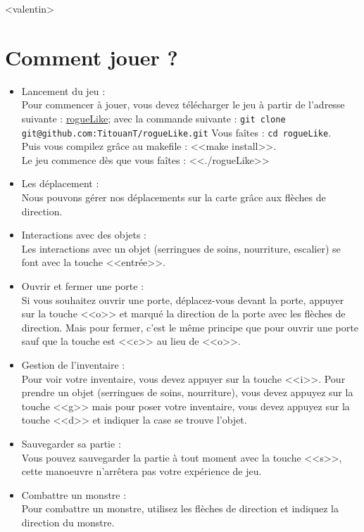 \documentclass[11pt]{report}
\begin{document}
	<valentin>
	
	\section{Comment jouer ?}
		\begin{itemize}
			\item{Lancement du jeu : \\}
				Pour commencer à jouer, vous devez télécharger le jeu à partir de l'adresse suivante : \href{https://github.com/TitouanT/rogueLike/} {rogueLike}; avec la commande suivante : \texttt{git clone git@github.com:TitouanT/rogueLike.git}
				Vous faîtes : \texttt{cd rogueLike}. \\
				Puis vous compilez grâce au makefile : <<make install>>. \\
				Le jeu commence dès que vous faîtes : <<./rogueLike>>		
			\item{Les déplacement : \\}
				Nous pouvons gérer nos déplacements sur la carte grâce aux flèches de direction. 
			\item{Interactions avec des objets : \\}	
				Les interactions avec un objet (serringues de soins, nourriture, escalier) se font avec la touche <<entrée>>.
			\item{Ouvrir et fermer une porte :\\}	
				Si vous souhaitez ouvrir une porte, déplacez-vous devant la porte, appuyer sur la touche <<o>> et marqué la direction de la porte avec les flèches de direction.
				Mais pour fermer, c'est le même principe que pour ouvrir une porte sauf que la touche est <<c>> au lieu de <<o>>.
			\item{Gestion de l'inventaire : \\}
				Pour voir votre inventaire, vous devez appuyer sur la touche <<i>>. Pour prendre un objet (serringues de soins, nourriture), vous devez appuyez sur la touche <<g>> mais pour poser votre inventaire, vous devez appuyez sur la touche <<d>> et indiquer la case se trouve l'objet.
			\item{Sauvegarder sa partie :\\}
				Vous pouvez sauvegarder la partie à tout moment avec la touche <<s>>, cette manoeuvre n'arrêtera pas votre expérience de jeu.
			\item{Combattre un monstre :\\}
				Pour combattre un monstre, utilisez les flèches de direction et indiquez la direction du monstre.		
		\end{itemize}
		
\end{document}
